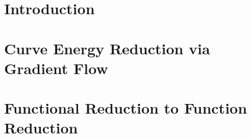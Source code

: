 \documentclass[a4paper, 12pt]{article}
\theoremstyle{definition}
\begin{document}



\tableofcontents

\part{Introduction}


\newpage
\part{Curve Energy Reduction via Gradient Flow}



\newpage
\part{Functional Reduction to Function Reduction}

\printbibliography
\end{document}
